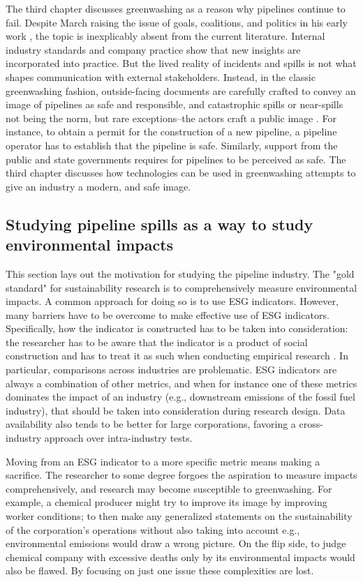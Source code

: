 The third chapter discusses greenwashing as a reason why pipelines continue to fail. Despite March raising the issue of goals, coalitions, and politics in his early work \citep{March1963}, the topic is inexplicably absent from the current literature. Internal industry standards and company practice show that new insights are incorporated into practice. But the lived reality of incidents and spills is not what shapes communication with external stakeholders. Instead, in the classic greenwashing fashion, outside-facing documents are carefully crafted to convey an image of pipelines as safe and responsible, and catastrophic spills or near-spills not being the norm, but rare exceptions--the actors craft a public image \citep{Lyon2015}. For instance, to obtain a permit for the construction of a new pipeline, a pipeline operator has to establish that the pipeline is safe. Similarly, support from the public and state governments requires for pipelines to be perceived as safe. The third chapter discusses how technologies can be used in greenwashing attempts to give an industry a modern, and safe image.


\subsection{Studying pipeline spills as a way to study environmental impacts}

This section lays out the motivation for studying the pipeline industry. The "gold standard" for sustainability research is to comprehensively measure environmental impacts. A common approach for doing so is to use ESG indicators. However, many barriers have to be overcome to make effective use of ESG indicators. Specifically, how the indicator is constructed has to be taken into consideration: the researcher has to be aware that the indicator is a product of social construction and has to treat it as such when conducting empirical research \citep{Eccles2019}. In particular, comparisons across industries are problematic. ESG indicators are always a combination of other metrics, and when for instance one of these metrics dominates the impact of an industry (e.g., downstream emissions of the fossil fuel industry), that should be taken into consideration during research design. Data availability also tends to be better for large corporations, favoring a cross-industry approach over intra-industry tests.

Moving from an ESG indicator to a more specific metric means making a sacrifice. The researcher to some degree forgoes the aspiration to measure impacts comprehensively, and research may become susceptible to greenwashing. For example, a chemical producer might try to improve its image by improving worker conditions; to then make any generalized statements on the sustainability of the corporation's operations without also taking into account e.g., environmental emissions would draw a wrong picture. On the flip side, to judge chemical company with excessive deaths only by its environmental impacts would also be flawed. By focusing on just one issue these complexities are lost.

